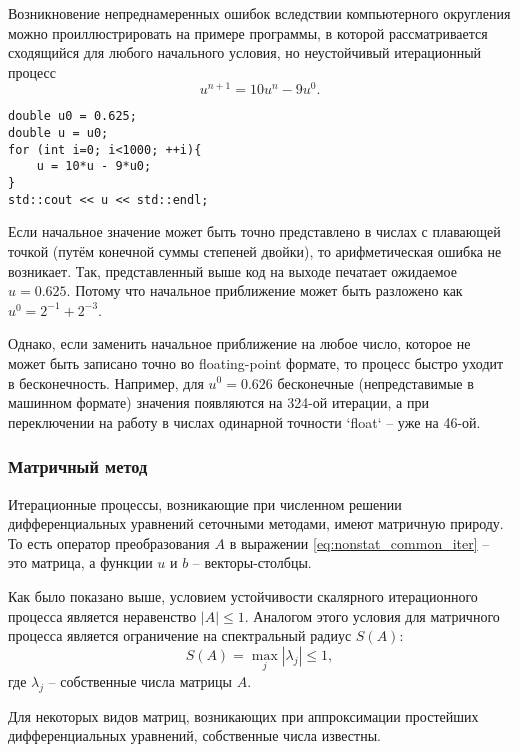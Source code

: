 Возникновение непреднамеренных ошибок вследствии компьютерного округления можно проиллюстрировать на примере
программы, в которой рассматривается сходящийся для любого начального условия, но неустойчивый итерационный процесс
\begin{equation*}
    u^{n+1} = 10 u^{n} - 9 u^{0}.
\end{equation*}

\begin{verbatim}
double u0 = 0.625;
double u = u0;
for (int i=0; i<1000; ++i){
    u = 10*u - 9*u0;
}
std::cout << u << std::endl;
\end{verbatim}

Если начальное значение может быть точно представлено в
числах с плавающей точкой (путём конечной суммы степеней двойки),
то арифметическая ошибка не возникает.
Так, представленный выше код на выходе печатает ожидаемое $u=0.625$.
Потому что начальное приближение может быть разложено как $u^0 = 2^{-1} + 2^{-3}$.

Однако, если заменить начальное приближение на любое число,
которое не может быть записано точно во floating-point формате,
то процесс быстро уходит в бесконечность.
Например, для $u^0 = 0.626$ бесконечные (непредставимые в машинном формате) значения
появляются на 324-ой итерации,
а при переключении на работу в числах одинарной точности `float` -- уже на 46-ой.

\subsubsection{Матричный метод}

Итерационные процессы, возникающие при численном решении
дифференциальных уравнений сеточными методами, имеют матричную природу.
То есть оператор преобразования $A$ в выражении \eqref{eq:nonstat_common_iter} -- это матрица,
а функции $u$ и $b$ -- векторы-столбцы.

Как было показано выше, условием устойчивости скалярного итерационного процесса является неравенство $|A| \leq 1$.
Аналогом этого условия для матричного процесса является ограничение на спектральный радиус $S(A)$:
\begin{equation}
    \label{eq:nonstat_spectral_radius}
    S(A) = \max_j{ | \lambda_j | } \leq 1,
\end{equation}
где $\lambda_j$ -- собственные числа матрицы $A$.

Для некоторых видов матриц, возникающих при аппроксимации простейших дифференциальных уравнений,
собственные числа известны.


